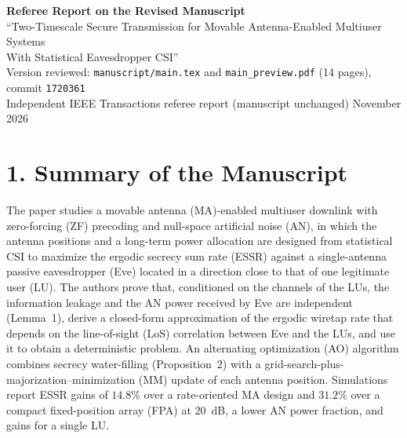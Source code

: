 \documentclass[10.5pt,a4paper]{article}
\begin{document}
\begin{center}
{\Large\bfseries Referee Report on the Revised Manuscript}\\[4pt]
{\large ``Two-Timescale Secure Transmission for Movable Antenna-Enabled Multiuser Systems\\ With Statistical Eavesdropper CSI''}\\[6pt]
\small Version reviewed: \texttt{manuscript/main.tex} and \texttt{main\_preview.pdf} (14 pages), commit \texttt{1720361}\\
Independent IEEE Transactions referee report (manuscript unchanged)\quad\textbullet{} November 2026
\end{center}

\section*{1. Summary of the Manuscript}
The paper studies a movable antenna (MA)-enabled multiuser downlink with zero-forcing (ZF) precoding and null-space artificial noise (AN), in which the antenna positions and a long-term power allocation are designed from statistical CSI to maximize the ergodic secrecy sum rate (ESSR) against a single-antenna passive eavesdropper (Eve) located in a direction close to that of one legitimate user (LU). The authors prove that, conditioned on the channels of the LUs, the information leakage and the AN power received by Eve are independent (Lemma~1), derive a closed-form approximation of the ergodic wiretap rate that depends on the line-of-sight (LoS) correlation between Eve and the LUs, and use it to obtain a deterministic problem. An alternating optimization (AO) algorithm combines secrecy water-filling (Proposition~2) with a grid-search-plus-majorization--minimization (MM) update of each antenna position. Simulations report ESSR gains of $14.8\%$ over a rate-oriented MA design and $31.2\%$ over a compact fixed-position array (FPA) at $20$~dB, a lower AN power fraction, and gains for a single LU.
\end{document}
